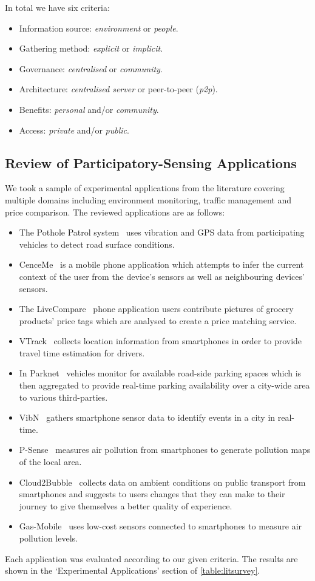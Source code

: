 In total we have six criteria:
\begin{itemize}
\item Information source: \emph{environment} or \emph{people}.
\item Gathering method: \emph{explicit} or \emph{implicit}.
\item Governance: \emph{centralised} or \emph{community}.
\item Architecture: \emph{centralised server} or peer-to-peer (\emph{p2p}).
\item Benefits: \emph{personal} and/or \emph{community}.
\item Access: \emph{private} and/or \emph{public}.
\end{itemize}

\subsection{Review of Participatory-Sensing Applications}

We took a sample of experimental applications from the literature covering multiple domains including environment monitoring, traffic management and price comparison. The reviewed applications are as follows:
\begin{itemize}
\item The Pothole Patrol system~\citep{Eriksson2008} uses vibration and GPS data from participating vehicles to detect road surface conditions.
\item CenceMe~\citep{Miluzzo2008} is a mobile phone application which attempts to infer the current context of the user from the device's sensors as well as neighbouring devices' sensors.
\item The LiveCompare~\citep{Deng2009} phone application users contribute pictures of grocery products' price tags which are analysed to create a price matching service.
\item VTrack~\citep{Thiagarajan2009} collects location information from smartphones in order to provide travel time estimation for drivers.
\item In Parknet~\citep{Mathur2010} vehicles monitor for available road-side parking spaces which is then aggregated to provide real-time parking availability over a city-wide area to various third-parties.
\item VibN~\citep{Miluzzo2011} gathers smartphone sensor data to identify events in a city in real-time.
\item P-Sense~\citep{Mendez2011} measures air pollution from smartphones to generate pollution maps of the local area.
\item Cloud2Bubble~\citep{Costa2012} collects data on ambient conditions on public transport from smartphones and suggests to users changes that they can make to their journey to give themselves a better quality of experience.
\item Gas-Mobile~\citep{Hasenfratz2012} uses low-cost sensors connected to smartphones to measure air pollution levels.
\end{itemize}
Each application was evaluated according to our given criteria. The results are shown in the `Experimental Applications' section of \autoref{table:litsurvey}. 

